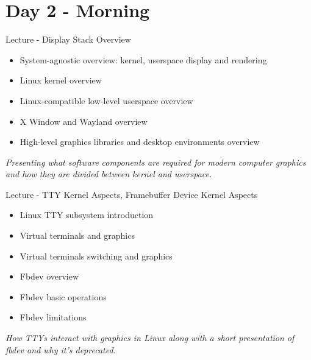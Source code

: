 \documentclass[a4paper,12pt,obeyspaces,spaces,hyphens]{article}
\begin{document}
\section{Day 2 - Morning}

\feagendatwocolumn
{Lecture - Display Stack Overview}
{
  \begin{itemize}
  \item System-agnostic overview: kernel, userspace display and rendering
  \item Linux kernel overview
  \item Linux-compatible low-level userspace overview
  \item X Window and Wayland overview
  \item High-level graphics libraries and desktop environments overview
  \end{itemize}
  \vspace{0.5em}
  {\em Presenting what software components are required for modern computer graphics and how they are divided between kernel and userspace.}
}
{Lecture - TTY Kernel Aspects, Framebuffer Device Kernel Aspects}
{
  \begin{itemize}
  \item Linux TTY subsystem introduction
  \item Virtual terminals and graphics
  \item Virtual terminals switching and graphics
  \end{itemize}
  \vspace{0.5em}
  \begin{itemize}
  \item Fbdev overview
  \item Fbdev basic operations
  \item Fbdev limitations
  \end{itemize}
  \vspace{0.5em}
  {\em How TTYs interact with graphics in Linux along with a short presentation of fbdev and why it's deprecated.}
}
\\
\end{document}

